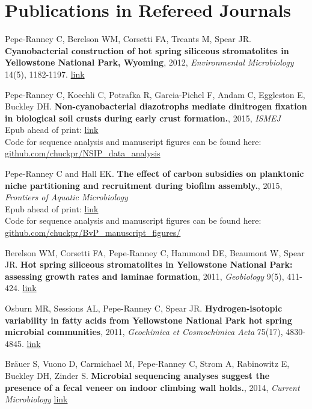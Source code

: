 \documentclass[letterpaper]{article}
\renewenvironment{itemize}{
  \begin{list}{}{
    \setlength{\leftmargin}{1.5em}
  }
}{
  \end{list}
}
\begin{document}
\section*{Publications in Refereed Journals}
\begin{itemize}
\item Pepe-Ranney C, Berelson WM, Corsetti FA, Treants M, Spear JR.
    \textbf{Cyanobacterial construction of hot spring siliceous stromatolites in
    Yellowstone National Park, Wyoming}, 2012, \textit{Environmental
    Microbiology} 14(5), 1182-1197. \href{http://www.ncbi.nlm.nih.gov/pubmed/22356555}{link} 
\item Pepe-Ranney C, Koechli C, Potrafka R, Garcia-Pichel F, Andam C, Eggleston E, Buckley DH. 
    \textbf{Non-cyanobacterial diazotrophs mediate dinitrogen fixation in
    biological soil crusts during early crust formation.}, 2015, \textit{ISMEJ}\\ 
    Epub ahead of print: \href{http://www.nature.com/ismej/journal/vaop/ncurrent/full/ismej2015106a.html}
    {link}\\
    Code for sequence analysis and manuscript figures can be found here:\\
    \href{http://www.github.com/chuckpr/NSIP_data_analysis}
    {github.com/chuckpr/NSIP\_data\_analysis}
\item Pepe-Ranney C and Hall EK. \textbf{The effect of carbon subsidies on
    planktonic niche partitioning and recruitment during biofilm
    assembly.}, 2015, \textit{Frontiers of Aquatic Microbiology}\\
    Epub ahead of print: \href{http://journal.frontiersin.org/article/10.3389/fmicb.2015.00703/abstract}
    {link}\\
    Code for sequence analysis and manuscript figures can be found here: \\
    \href{http://www.github.com/chuckpr/BvP_manuscript_figures/}
    {github.com/chuckpr/BvP\_manuscript\_figures/}
\item Berelson WM, Corsetti FA, Pepe-Ranney C, Hammond DE, Beaumont W, Spear
    JR. \textbf{Hot spring siliceous stromatolites in Yellowstone National Park:
    assessing growth rates and laminae formation}, 2011, {\it Geobiology}
    9(5), 411-424. \href{http://www.ncbi.nlm.nih.gov/pubmed/21777367}{link}
\item Osburn MR, Sessions AL, Pepe-Ranney C, Spear JR. \textbf{Hydrogen-isotopic
    variability in fatty acids from Yellowstone National Park hot spring
    microbial communities}, 2011, {\it Geochimica et Cosmochimica Acta}
    75(17), 4830-4845.
    \href{http://www.sciencedirect.com/science/article/pii/S0016703711003152}{link}
\item Br\"{a}uer S, Vuono D, Carmichael M, Pepe-Ranney C, Strom A, Rabinowitz
    E, Buckley DH, Zinder S. \textbf{Microbial sequencing analyses suggest
    the presence of a fecal veneer on indoor climbing wall holds.}, 2014, {\it
    Current Microbiology} \href{http://www.ncbi.nlm.nih.gov/pubmed/24972665}{link}
\end{itemize}
\end{document}
